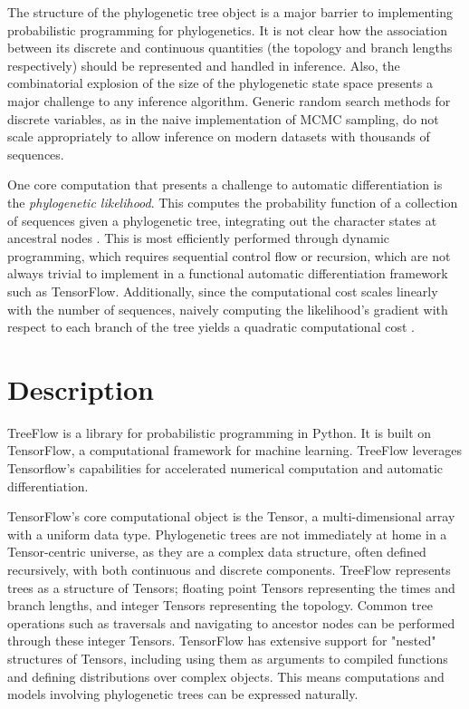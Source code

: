 The structure of the phylogenetic tree object is a major barrier to implementing probabilistic programming for phylogenetics. It is not clear how the association between its discrete and continuous quantities (the topology and branch lengths respectively) should be represented and handled in inference. Also, the combinatorial explosion of the size of the phylogenetic state space presents a major challenge to any inference algorithm. Generic random search methods for discrete variables, as in the naive implementation of MCMC sampling, do not scale appropriately to allow inference on modern datasets with thousands of sequences.

One core computation that presents a challenge to automatic differentiation is the \textit{phylogenetic likelihood}. This computes the probability function of a collection of sequences given a phylogenetic tree, integrating out the character states at ancestral nodes \cite{felsenstein1981evolutionary}. This is most efficiently performed through dynamic programming, which requires sequential control flow or recursion, which are not always trivial to implement in a functional automatic differentiation framework such as TensorFlow. Additionally, since the computational cost scales linearly with the number of sequences, naively computing the likelihood's gradient with respect to each branch of the tree yields a quadratic computational cost \cite{ji2020gradients}.



\section{Description}

TreeFlow is a library for probabilistic programming in Python. It is built on TensorFlow, a computational framework for machine learning. TreeFlow leverages Tensorflow's capabilities for accelerated numerical computation and automatic differentiation.

TensorFlow's core computational object is the Tensor, a multi-dimensional array with a uniform data type. Phylogenetic trees are not immediately at home in a Tensor-centric universe, as they are a complex data structure, often defined recursively, with both continuous and discrete components. TreeFlow represents trees as a structure of Tensors; floating point Tensors representing the times and branch lengths, and integer Tensors representing the topology. Common tree operations such as traversals and navigating to ancestor nodes can be performed through these integer Tensors. TensorFlow has extensive support for "nested" structures of Tensors, including using them as arguments to compiled functions and defining distributions over complex objects. This means computations and models involving phylogenetic trees can be expressed naturally.

